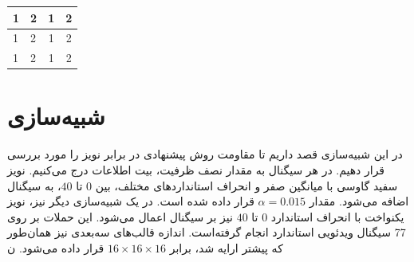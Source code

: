 \documentclass[11pt,a4paper,twocolumn]{article}
\numberwithin{table}{section}
\begin{document}
\onecolumn
\begin{@twocolumnfalse}
\begin{table}
\begin{tabular}{p{3cm}p{3cm}cc}
1 & 2 & 1 & 2\\\hline
1 & 2 & 1 & 2\\\hline
1 & 2 & 1 & 2\\\hline
\end{tabular}
\end{table}
\end{@twocolumnfalse}

\section{شبیه‌سازی}
\label{Sec:ExperimentalResults}
 در این شبیه‌سازی قصد داریم تا مقاومت روش پیشنهادی در برابر نویز را مورد بررسی قرار دهیم. در هر سیگنال به مقدار نصف ظرفیت، بیت اطلاعات درج می‌کنیم. نویز سفید گاوسی با میانگین صفر و انحراف استانداردهای مختلف، بین  $0$  تا $40$، به سیگنال اضافه می‌شود. مقدار $\alpha = 0.015$ قرار داده شده است. در یک شبیه‌سازی دیگر نیز، نویز یکنواخت با انحراف استاندارد {$0$} تا {$40$} نیز بر سیگنال اعمال می‌شود.  این حملات بر روی 77 سیگنال ویدئویی استاندارد انجام گرفته‌است. اندازه قالب‌های سه‌بعدی نیز همان‌طور که پیشتر ارایه شد، برابر $16 \times 16 \times 16$ قرار داده می‌شود. ن
 
\end{document}
